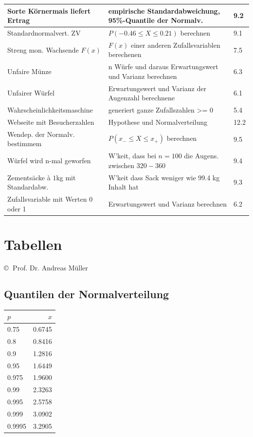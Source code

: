 \begin{center}
\begin{tabular}{|l|l|l|}
Sorte Körnermais liefert Ertrag & empirische Standardabweichung, 95\%-Quantile der Normalv. & 9.2 \\ \hline
Standardnormalvert. ZV& $P(-0.46 \leq X \leq 0.21)$ berechnen & 9.1 \\ \hline
Streng mon. Wachsende $F(x)$ & $F(x)$ einer anderen Zufallsvariablen berechenen & 7.5 \\ \hline
Unfaire Münze & n Würfe und daraus Erwartungswert und Varianz berechnen & 6.3 \\ \hline
Unfairer Würfel & Erwartungswert und Varianz der Augenzahl berechnene & 6.1 \\ \hline
Wahrscheinlichkeitsmaschine & generiert ganze Zufallszahlen >= 0 & 5.4 \\ \hline
Webseite mit Besucherzahlen & Hypothese und Normalverteilung & 12.2 \\ \hline
Wendep. der Normalv. bestimmem & $P(x_{-} \leq X \leq x_{+})$  berechnen & 9.5
\\ \hline Würfel wird n-mal geworfen & W'keit, dass bei $n=100$ die Augens. zwischen $320-360$ & 9.4 \\ \hline
Zementsäcke à $1$kg mit Standardabw. & W'keit dass Sack weniger wie 99.4 kg Inhalt hat & 9.3 \\ \hline
Zufallsvariable mit Werten 0 oder 1 & Erwartungswert und Varianz berechnen & 6.2 \\ \hline
\end{tabular}
\end{center}

\newpage

\section{Tabellen}
\copyright$\;$ Prof. Dr. Andreas Müller
\subsection{Quantilen der Normalverteilung}
	\begin{minipage}{18cm}
    	\centering
    	\scriptsize
\begin{tabular}{|l|r|}
\hline
$p$&$x$\\
\hline
0.75&0.6745\\
0.8&0.8416\\
0.9&1.2816\\
0.95&1.6449\\
0.975&1.9600\\
0.99&2.3263\\
0.995&2.5758\\
0.999&3.0902\\
0.9995&3.2905\\
\hline
\end{tabular}
    \end{minipage}

